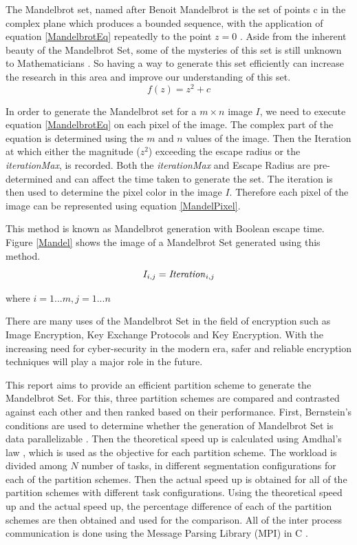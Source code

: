 \documentclass[conference]{IEEEtran}
\begin{document}
	The Mandelbrot set, named after Benoit Mandelbrot is the set of points c in the complex plane which produces a bounded sequence, with the application of equation \ref{MandelbrotEq} repeatedly to the point $z=0$ \cite{Mandelbrotset}. Aside from the inherent beauty of the Mandelbrot Set, some of the mysteries of this set is still unknown to Mathematicians \cite{lamb_2017}. So having a way to generate this set efficiently can increase the research in this area and improve our understanding of this set. 
	\begin{equation}
		f(z)=z^{2} + c \label{MandelbrotEq}
	\end{equation}
	
	In order to generate the Mandelbrot set for a $m \times n$ image $I$, we need to execute equation \ref{MandelbrotEq} on each pixel of the image. The complex part of the equation is determined using the $m$ and $n$ values of the image. Then the Iteration at which either the magnitude ($z^2$) exceeding the escape radius or the \textit{iterationMax}, is recorded. Both the \textit{iterationMax} and Escape Radius are pre-determined and can affect the time taken to generate the set. The iteration is then used to determine the pixel color in the image $I$. Therefore each pixel of the image can be represented using equation \ref{MandelPixel}. 
	
	This method is known as Mandelbrot generation with Boolean escape time. Figure \ref{Mandel} shows the image of a Mandelbrot Set generated using this method.
			\begin{equation}
	I_{i,j} = \text{\emph{Iteration}}_{i,j}  \label{MandelPixel}
	\end{equation}
	\begin{center}
		where $i = 1...m, j = 1...n$
	\end{center}
	


	There are many uses of the Mandelbrot Set in the field of encryption such as Image Encryption\cite{Iencryption}, Key Exchange Protocols \cite{alia2007new} and Key Encryption\cite{agarwal2017symmetric}. With the increasing need for cyber-security in the modern era, safer and reliable encryption techniques will play a major role in the future.
 	
	This report aims to provide an efficient partition scheme to generate the Mandelbrot Set. For this, three partition schemes are compared and contrasted against each other and then ranked based on their performance. 
	First, Bernstein's conditions are used to determine whether the generation of Mandelbrot Set is data parallelizable \cite{bernstein1996analysis}. Then the theoretical speed up is calculated using Amdhal's law \cite{amdahl1967validity}, which is used as the objective for each partition scheme.  The workload is divided among $N$ number of tasks, in different segmentation configurations for each of the partition schemes. Then the actual speed up is obtained for all of the partition schemes with different task configurations. Using the theoretical speed up and the actual speed up, the percentage difference of each of the partition schemes are then obtained and used for the comparison. All of the inter process communication is done using the Message Parsing Library (MPI) in C \cite{openmpi}.
\end{document}
